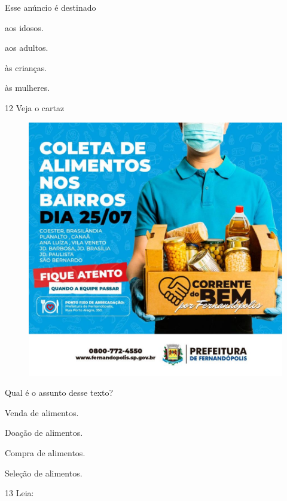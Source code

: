 
Esse anúncio é destinado

\begin{escolha}
\item aos idosos.

\item aos adultos.

\item às crianças.

\item às mulheres.
\end{escolha}


\num{12} Veja o cartaz

\begin{figure}[htpb!]
\centering
\includegraphics[width=.5\textwidth]{media/image171.jpeg}
\end{figure}


Qual é o assunto desse texto?

\begin{escolha}
\item Venda de alimentos.

\item Doação de alimentos.

\item Compra de alimentos.

\item Seleção de alimentos.
\end{escolha}


\num{13} Leia:

